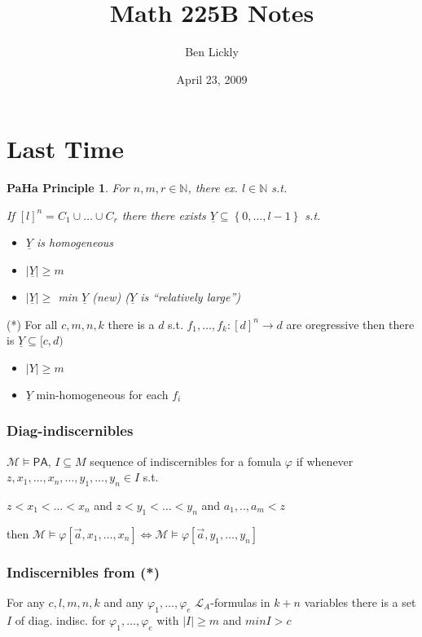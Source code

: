 \documentclass[12pt]{article}
\author{Ben Lickly}
\date{April 23, 2009}
\title{Math 225B Notes}
\newcommand{\Nat}{\ensuremath{\mathbb{N}}}
\newcommand{\PA}{\ensuremath{\mathsf{PA}}}
\begin{document}
\maketitle

\section{Last Time}
\newtheorem{parhar}{PaHa Principle}
\begin{parhar}
 For $n, m, r \in \Nat$, there ex. $l \in \Nat$ s.t.

If $[l]^n = C_1 \cup \dots \cup C_r$
there there exists $\underline{Y} \subseteq \left\{ 0, \dots, l-1 \right\}$ s.t.
\begin{itemize}
  \item $\underline{Y}$ is homogeneous
  \item $|\underline{Y}| \ge m$
  \item $|\underline{Y}| \ge$ min $\underline{Y}$ (new)
    ($\underline{Y}$ is ``relatively large'')
\end{itemize}
\end{parhar}

(*) For all $c,m,n,k$ there is a $d$ s.t.
$f_1,\dots,f_k : [d]^n \rightarrow d$ are oregressive
then there is $\underline{Y} \subseteq [c,d)$
\begin{itemize}
  \item $|Y| \ge m$
  \item $\underline{Y}$ min-homogeneous for each $f_i$
\end{itemize}

\subsubsection{Diag-indiscernibles}
$\mathcal{M} \models \PA$, $I \subseteq M$ sequence of
indiscernibles for a fomula $\varphi$
if whenever $z, x_1, \dots, x_n, \dots, y_1, \dots, y_n \in I$ s.t.

$z < x_1 < \dots < x_n$
and
$z < y_1 < \dots < y_n$
and
$a_1, .., a_m < z$

then $\mathcal{M} \models \varphi[\vec{a}, x_1, \dots, x_n] \Leftrightarrow
\mathcal{M} \models \varphi[\vec{a}, y_1, \dots, y_n]$

\subsubsection{Indiscernibles from (*)}
For any $c, l, m, n, k$ and any $\varphi_1, \dots, \varphi_e$
$\mathcal{L}_A$-formulas in $k+n$ variables there is a set $I$ of
diag. indisc. for $\varphi_1, \dots, \varphi_e$ with $|I| \ge m$ and
$min I > c$
\end{document}
